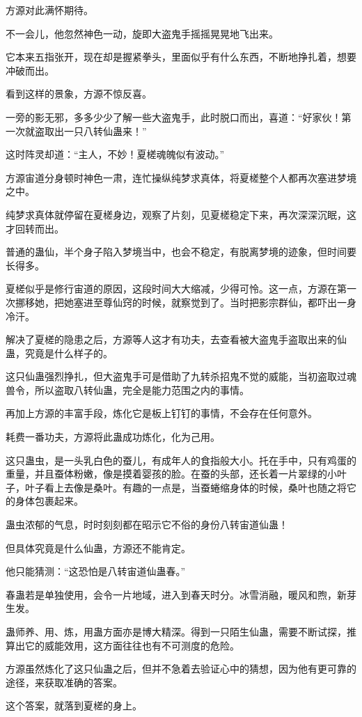\begin{this_body}
方源对此满怀期待。

不一会儿，他忽然神色一动，旋即大盗鬼手摇摇晃晃地飞出来。

它本来五指张开，现在却是握紧拳头，里面似乎有什么东西，不断地挣扎着，想要冲破而出。

看到这样的景象，方源不惊反喜。

一旁的影无邪，多多少少了解一些大盗鬼手，此时脱口而出，喜道：“好家伙！第一次就盗取出一只八转仙蛊来！”

这时阵灵却道：“主人，不妙！夏槎魂魄似有波动。”

方源宙道分身顿时神色一肃，连忙操纵纯梦求真体，将夏槎整个人都再次塞进梦境之中。

纯梦求真体就停留在夏槎身边，观察了片刻，见夏槎稳定下来，再次深深沉眠，这才回转而出。

普通的蛊仙，半个身子陷入梦境当中，也会不稳定，有脱离梦境的迹象，但时间要长得多。

夏槎似乎是修行宙道的原因，这段时间大大缩减，少得可怜。这一点，方源在第一次挪移她，把她塞进至尊仙窍的时候，就察觉到了。当时把影宗群仙，都吓出一身冷汗。

解决了夏槎的隐患之后，方源等人这才有功夫，去查看被大盗鬼手盗取出来的仙蛊，究竟是什么样子的。

这只仙蛊强烈挣扎，但大盗鬼手可是借助了九转杀招鬼不觉的威能，当初盗取过魂兽令，所以盗取八转仙蛊，完全是能力范围之内的事情。

再加上方源的丰富手段，炼化它是板上钉钉的事情，不会存在任何意外。

耗费一番功夫，方源将此蛊成功炼化，化为己用。

这只蛊虫，是一头乳白色的蚕儿，有成年人的食指般大小。托在手中，只有鸡蛋的重量，并且蚕体粉嫩，像是摸着婴孩的脸。在蚕的头部，还长着一片翠绿的小叶子，叶子看上去像是桑叶。有趣的一点是，当蚕蜷缩身体的时候，桑叶也随之将它的身体包裹起来。

蛊虫浓郁的气息，时时刻刻都在昭示它不俗的身份八转宙道仙蛊！

但具体究竟是什么仙蛊，方源还不能肯定。

他只能猜测：“这恐怕是八转宙道仙蛊春。”

春蛊若是单独使用，会令一片地域，进入到春天时分。冰雪消融，暖风和煦，新芽生发。

蛊师养、用、炼，用蛊方面亦是博大精深。得到一只陌生仙蛊，需要不断试探，推算出它的威能效用，这方面往往也有不可测度的危险。

方源虽然炼化了这只仙蛊之后，但并不急着去验证心中的猜想，因为他有更可靠的途径，来获取准确的答案。

这个答案，就落到夏槎的身上。


\end{this_body}
